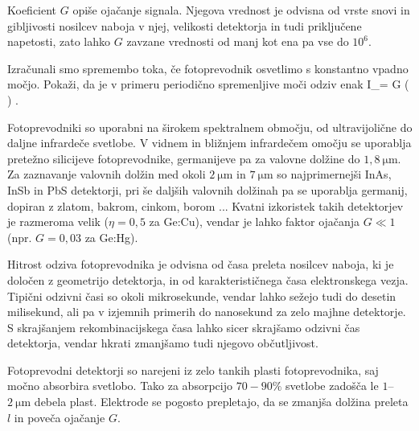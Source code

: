 Koeficient $G$ opiše ojačanje signala. Njegova vrednost je odvisna od 
vrste snovi in gibljivosti nosilcev naboja v njej, velikosti
detektorja in tudi priključene napetosti, zato lahko $G$ zavzane vrednosti od manj kot ena pa
vse do $10^6$. 

\begin{definition}
Izračunali smo spremembo toka, če fotoprevodnik osvetlimo s konstantno vpadno močjo. Pokaži, da
 je v primeru periodično spremenljive moči odziv enak
 \beq
\Delta I_\omega = G \left( \right) .
 \eeq
 
\end{definition}

Fotoprevodniki so uporabni na širokem spektralnem območju, od ultra\-vijolične 
do daljne infra\-rdeče svetlobe. V vidnem in bližnjem infrardečem omočju se 
uporablja pretežno silicijeve fotoprevodnike, germanijeve
pa za valovne dolžine do $1,8~\si{\micro\meter}$. Za zaznavanje valovnih dolžin med okoli 
$2~\si{\micro\meter}$ in $7~\si{\micro\meter}$ so najprimernejši InAs, InSb in PbS detektorji, 
pri še daljših valovnih dolžinah pa se uporablja germanij, dopiran z zlatom, bakrom, cinkom, borom ...
Kvatni izkoristek takih detektorjev je razmeroma velik ($\eta = 0,5$ za Ge:Cu), vendar
je lahko faktor ojačanja $G \ll 1$ (npr. $G = 0,03$ za Ge:Hg). 

Hitrost odziva fotoprevodnika je odvisna od časa preleta nosilcev naboja,
ki je določen z geometrijo detektorja, in od karakterističnega časa elektronskega vezja. 
Tipični odzivni časi so okoli mikrosekunde, vendar lahko sežejo
tudi do desetin milisekund, ali pa v izjemnih primerih do nanosekund za zelo majhne detektorje.
S skrajšanjem rekombinacijskega časa lahko sicer skrajšamo odzivni čas detektorja, 
vendar hkrati zmanjšamo tudi njegovo občutljivost.

\begin{remark}
Fotoprevodni detektorji so narejeni iz zelo tankih plasti fotoprevodnika, saj močno absorbira
svetlobo. Tako za absorpcijo $70-90\%$ svetlobe zadošča le $1$--$2~\si{\micro\meter}$ debela plast.
Elektrode se pogosto prepletajo, da se zmanjša dolžina preleta $l$ in poveča ojačanje $G$. 
\end{remark}

